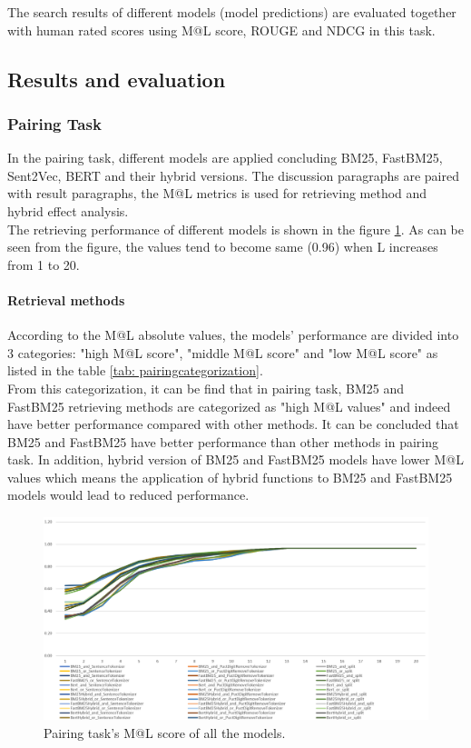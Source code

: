 The search results of different models (model predictions) are evaluated together with human rated scores using M@L score, ROUGE and NDCG in this task.


\subsection{Results and evaluation}			

\subsubsection{Pairing Task} %

In the pairing task, different models are applied concluding BM25, FastBM25, Sent2Vec, BERT and their hybrid versions.
The discussion paragraphs are paired with result paragraphs, the M@L metrics is used for retrieving method and hybrid effect analysis.\\

The retrieving performance of different models is shown in the figure \ref{fig: pairingtaskmlscore}. As can be seen from the figure, the values tend to become same (0.96) when L increases from 1 to 20.

\paragraph{Retrieval methods} %
According to the M@L absolute values, the models' performance are divided into 3 categories: "high M@L score", "middle M@L score" and "low M@L score" as listed in the table \ref{tab: pairingcategorization}.\\

From this categorization, it can be find that in pairing task, BM25 and FastBM25 retrieving methods are categorized as "high M@L values" and indeed have better performance compared with other methods. It can be concluded that BM25 and FastBM25 have better performance than other methods in pairing task.
In addition, hybrid version of BM25 and FastBM25 models have lower M@L values which means 
the application of hybrid functions to BM25 and FastBM25 models would lead to reduced performance.


\begin{figure}[htbp]
	\centering
	\includegraphics[width=\textwidth]{figure/partB_pairing_M@L_all_models.png}
	\caption[]{Pairing task's M@L score of all the models.}
	\label{fig: pairingtaskmlscore}
\end{figure}

